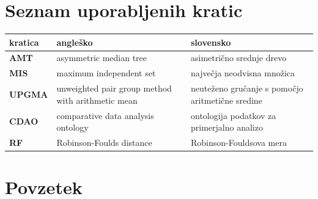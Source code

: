 \documentclass[a4paper, 12pt]{book}
\newcommand{\clearemptydoublepage}{\newpage{\pagestyle{empty}\cleardoublepage}}
\begin{document}
\clearemptydoublepage

\def\thepage{}%
\setcounter{tocdepth}{3}
\tableofcontents{}


\clearemptydoublepage


\chapter*{Seznam uporabljenih kratic}

\begin{tabular}{l|p{6cm}|p{6cm}}
  {\bf kratica} & {\bf angleško} & {\bf slovensko} \\ \hline
  {\bf AMT} & asymmetric median tree & asimetrično srednje drevo \\
  {\bf MIS} & maximum independent set & največja neodvisna množica \\
  {\bf UPGMA} & unweighted pair group method with arithmetic mean & neuteženo gručanje s pomočjo aritmetične sredine \\
  {\bf CDAO} & comparative data analysis ontology  & ontologija podatkov za primerjalno analizo \\
  {\bf RF} & Robinson-Foulds distance & Robinson-Fouldsova mera \\
\end{tabular}



\clearemptydoublepage

\chapter*{Povzetek}
\end{document}
